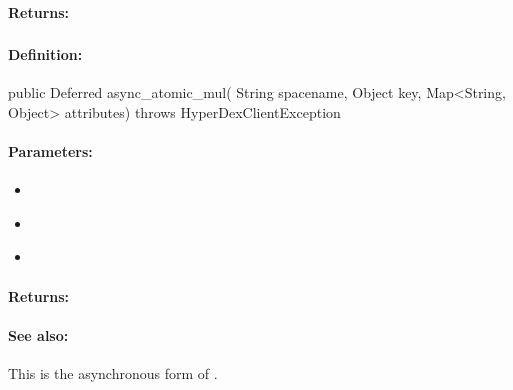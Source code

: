 \paragraph{Returns:}


\pagebreak
\subsubsection{}
\label{api:java:async_atomic_mul}


\paragraph{Definition:}
\begin{javacode}
public Deferred async_atomic_mul(
        String spacename,
        Object key,
        Map<String, Object> attributes) throws HyperDexClientException
\end{javacode}

\paragraph{Parameters:}
\begin{itemize}[noitemsep]
\item {}\\

\item {}\\

\item {}\\

\end{itemize}

\paragraph{Returns:}


\paragraph{See also:}  This is the asynchronous form of .

\pagebreak

